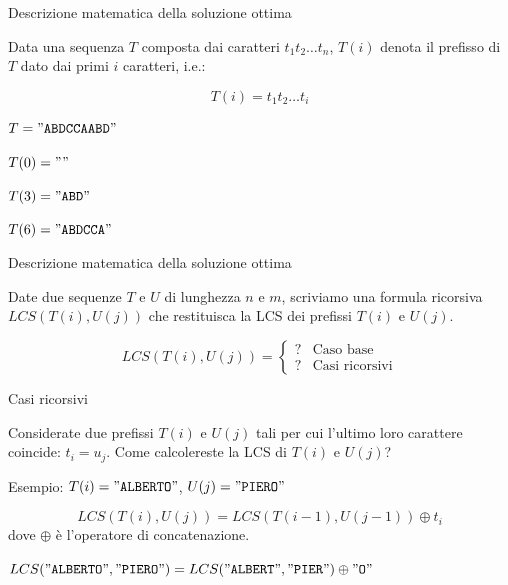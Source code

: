 \begin{frame}{Descrizione matematica della soluzione ottima}

\vspace{-9pt}
\begin{myboxtitle}
Data una sequenza $T$ composta dai caratteri $t_1t_2{\ldots}t_n$, $T(i)$ denota 
il \alert{prefisso} di $T$ dato dai primi $i$ caratteri, i.e.:

\[
  T(i) = t_1t_2{\ldots}t_i
\]
\end{myboxtitle}

\begin{myboxtitle}[Esempi]
\BIL
\item $T = \mathtt{"ABDCCAABD"}$
\item $T(0) = \mathtt{""}$
\item $T(3) = \mathtt{"ABD"}$
\item $T(6) = \mathtt{"ABDCCA"}$
\EIL
\end{myboxtitle}
\end{frame}

\begin{frame}{Descrizione matematica della soluzione ottima}

\vspace{-9pt}
\begin{myboxtitle}[Goal]
Date due sequenze $T$ e $U$ di lunghezza $n$ e $m$, scriviamo
una formula ricorsiva $LCS(T(i), U(j))$ che restituisca la LCS 
dei prefissi $T(i)$ e $U(j)$.
\end{myboxtitle}

\[
  LCS(T(i), U(j)) = \begin{cases}
   ? & \textrm{Caso base} \\
   ? & \textrm{Casi ricorsivi}
  \end{cases}
\]

\end{frame}

\begin{frame}{Casi ricorsivi}

\vspace{-9pt}

Considerate due prefissi $T(i)$ e $U(j)$ tali per cui l'ultimo loro
carattere coincide: $t_i = u_j$. Come calcolereste la  LCS di $T(i)$ e $U(j)$?

\BIL
\item Esempio: $T(i)="\texttt{ALBERTO}"$, $U(j)="\texttt{PIERO}"$
\EIL

\pause
\bigskip
{}
\[
  LCS(T(i),U(j)) = LCS(T(i-1), U(j-1)) \oplus t_i
\]
dove $\oplus$ è l'operatore di concatenazione.

\BIL
\item $LCS("\texttt{ALBERTO}","\texttt{PIERO}") = LCS("\texttt{ALBERT}","\texttt{PIER}") \oplus "\mathtt{O}"$
\EIL

\end{frame}

